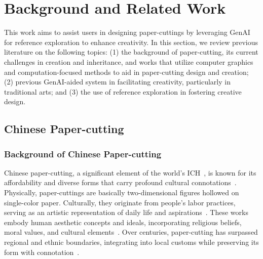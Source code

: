 \section{Background and Related Work}
This work aims to assist users in designing paper-cuttings by leveraging GenAI for reference exploration to enhance creativity. In this section, we review previous literature on the following topics: (1) the background of paper-cutting, its current challenges in creation and inheritance, and works that utilize computer graphics and computation-focused methods to aid in paper-cutting design and creation; (2) previous GenAI-aided system in facilitating creativity, particularly in traditional arts; and (3) the use of reference exploration in fostering creative design.

\subsection{Chinese Paper-cutting}

\subsubsection{Background of Chinese Paper-cutting}

Chinese paper-cutting, a significant element of the world's ICH~\cite{ich2009unesco}, is known for its affordability and diverse forms that carry profound cultural connotations~\cite{Qiao:2011:liveICH, Bai:2003:stylistic, Hu:2017:tda}. Physically, paper-cuttings are basically two-dimensional figures hollowed on single-color paper. Culturally, they originate from people's labor practices, serving as an artistic representation of daily life and aspirations~\cite{Cui:2016:sot, Wang:2021:dap, Wang:2021:folk}. These works embody human aesthetic concepts and ideals, incorporating religious beliefs, moral values, and cultural elements~\cite{Cao:2023:the}.
Over centuries, paper-cutting has surpassed regional and ethnic boundaries, integrating into local customs while preserving its form with connotation~\cite{Zhang:2018:sos, Ma:2010:sof}. 



